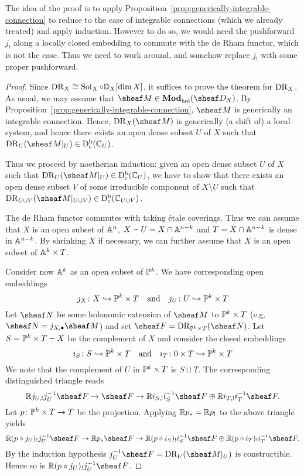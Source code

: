 \documentclass[number-in-sections,a4paper]{notes}
\begin{document}
The idea of the proof is to apply Proposition~\ref{prop:generically-integrable-connection} to reduce to the case of integrable connections (which we already treated) and apply induction.
However to do so, we would need the pushforward $j_!$ along a locally closed embedding to commute with the de Rham functor, which is not the case.
Thus we need to work around, and somehow replace $j_!$ with some proper pushforward.

\begin{proof}
    Since $\operatorname{DR}_X \cong \operatorname{Sol}_X \circ \mathbb{D}_X[\dim X]$, it suffices to prove the theorem for $\operatorname{DR}_X$.
    As usual, we may assume that $\sheaf M \in \catDModhol{X}$.
    By Proposition~\ref{prop:generically-integrable-connection}, $\sheaf M$ is generically an integrable connection.
    Hence, $\DR_X(\sheaf M)$ is generically (a shift of) a local system, and hence there exists an open dense subset $U$ of $X$ such that $\DR_U(\res{\sheaf M}{U}) \in \catDbConstr{U}$.

    Thus we proceed by noetherian induction: given an open dense subset $U$ of $X$ such that $\DR_U(\res{\sheaf M}U) \in \catDbConstr{U}$, we have to show that there exists an open dense subset $V$ of some irreducible component of $X \setminus U$ such that $\DR_{U\cup V}(\res{\sheaf M}{U \cup V}) \in \catDbConstr{U \cup V}$.

    The de Rham functor commutes with taking \'etale coverings.
    Thus we can assume that $X$ is an open subset of $\mathbb A^{n}_{}$, $X - U = X \cap \mathbb A^{n-k}_{}$ and $T = X \cap \mathbb A^{n-k}_{}$ is dense in $\mathbb A^{n-k}_{}$.
    By shrinking $X$ if necessary, we can further assume that $X$ is an open subset of $\mathbb A^{k}_{} \times T$.

    Consider now $\mathbb A^{k}_{}$ as an open subset of $\mathbb P^{k}_{}$.
    We have corresponding open embeddings
    \[
        j_X\colon X \hookrightarrow \mathbb P^{k}_{} \times T
        \quad\text{and}\quad
        j_U\colon U \hookrightarrow \mathbb P^{k}_{} \times T
    \]
    Let $\sheaf N$ be some holonomic extension of $\sheaf M$ to $\mathbb P^{k}_{} \times T$ (e.g.~$\sheaf N = j_{X,\bullet} \sheaf M$) and set $\sheaf F = \DR_{\ps k \times T}(\sheaf N)$.
    Let $S = \mathbb P^{k}_{} \times T - X$ be the complement of $X$ and consider the closed embeddings
    \[
        i_S\colon S \hookrightarrow \mathbb P^{k}_{} \times T
        \quad\text{and}\quad
        i_T\colon 0 \times T \hookrightarrow \mathbb P^{k}_{} \times T
    \]
    We note that the complement of $U$ in $\mathbb P^{k}_{} \times T$ is $S \sqcup T$.
    The corresponding distinguished triangle reads
    \[
        \RR j_{U,!}j_U^{-1} \sheaf F 
        \to
        \sheaf F
        \to
        \RR i_{S,!}i_S^{-1} \sheaf F \oplus \RR i_{T,!}i_T^{-1} \sheaf F.
    \]
    Let $p\colon \mathbb P^{k}_{} \times T \to T$ be the projection.
    Applying ${\mathbb{R}} p_* = {\mathbb{R}} p_!$ to the above triangle yields
    \[
        \RR (p \circ j_U)_!j_U^{-1} \sheaf F 
        \to
        \RR p_* \sheaf F
        \to
        \RR (p \circ i_{S})_!i_S^{-1} \sheaf F \oplus \RR ( p \circ i_T)_!i_T^{-1} \sheaf F.
    \]
    By the induction hypothesis $j_U^{-1}\sheaf F = \DR_{U}(\res{\sheaf M}U)$ is constructible.
    Hence so is $\RR (p \circ j_U)_!j_U^{-1} \sheaf F$.


\end{proof}
\end{document}
